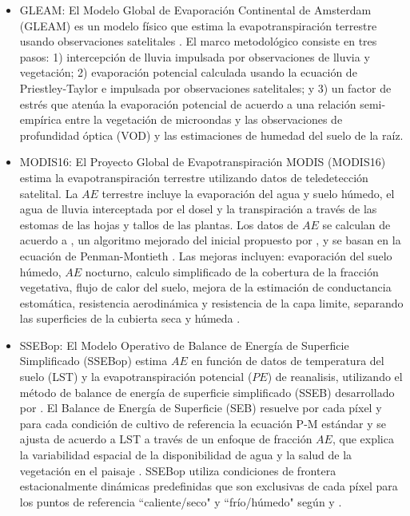 \documentclass[12pt]{article}
\begin{document}
\begin{itemize}
	\item GLEAM: El Modelo Global de Evaporación Continental de Amsterdam (GLEAM) es un modelo físico que estima la evapotranspiración terrestre usando observaciones satelitales \citep{Martens2017}. El marco metodológico consiste en tres pasos: 1) intercepción de lluvia impulsada por observaciones de lluvia y vegetación; 2) evaporación potencial calculada usando la ecuación de Priestley-Taylor \citep[P-T;][]{priestley1972assessment} e impulsada por observaciones satelitales; y 3) un factor de estrés que atenúa la evaporación potencial de acuerdo a una relación semi-empírica entre la vegetación de microondas y las observaciones de profundidad óptica (VOD) y las estimaciones de humedad del suelo de la raíz. %
	
	\item MODIS16: El Proyecto Global de Evapotranspiración MODIS (MODIS16) estima la evapotranspiración terrestre utilizando datos de teledetección satelital. La $AE$ terrestre incluye la evaporación del agua y suelo húmedo, el agua de lluvia interceptada por el dosel y la transpiración a través de las estomas de las hojas y tallos de las plantas. Los datos de $AE$ se calculan de acuerdo a \citet{mu2013modis}, un algoritmo mejorado del inicial propuesto por \citet{mu2007development}, y se basan en la ecuación de Penman-Montieth \citep[P-M;][]{monteith1965evaporation}. Las mejoras incluyen: evaporación del suelo húmedo, $AE$ nocturno, calculo simplificado de la cobertura de la fracción vegetativa, flujo de calor del suelo, mejora de la estimación de conductancia estomática, resistencia aerodinámica y resistencia de la capa limite, separando las superficies de la cubierta seca y húmeda \citep{mu2013modis}.
	
	\item SSEBop: El Modelo Operativo de Balance de Energía de Superficie Simplificado (SSEBop) estima $AE$ en función de datos de temperatura del suelo (LST) y la evapotranspiración potencial ($PE$) de reanalisis, utilizando el método de balance de energía de superficie simplificado (SSEB) desarrollado por \citet{senay2007coupled,senay2011enhancing}. El Balance de Energía de Superficie (SEB) resuelve por cada píxel y para cada condición de cultivo de referencia la ecuación P-M estándar y se ajusta de acuerdo a LST a través de un enfoque de fracción $AE$, que explica la variabilidad espacial de la disponibilidad de agua y la salud de la vegetación en el paisaje \citep{savoca2013actual}. SSEBop utiliza condiciones de frontera estacionalmente dinámicas predefinidas que son exclusivas de cada píxel para los puntos de referencia ``caliente/seco" y ``frío/húmedo" según \citet{bastiaanssen2014earth} y \citet{allen2007satellite}.
	

\end{itemize}
\end{document}

